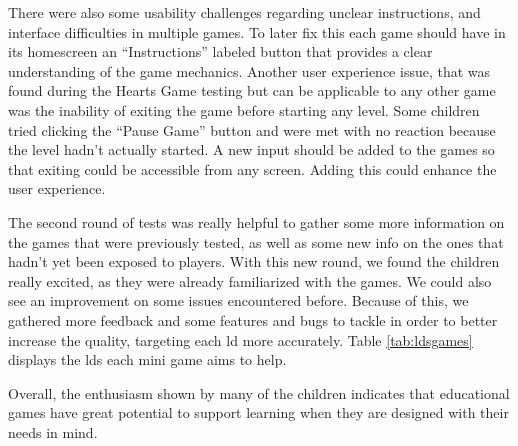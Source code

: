 
There were also some usability challenges regarding unclear instructions, and interface difficulties in multiple games. To later fix this each game should have in its homescreen an ``Instructions'' labeled button that provides a clear understanding of the game mechanics. Another user experience issue, that was found during the Hearts Game testing but can be applicable to any other game was the inability of exiting the game before starting any level. Some children tried clicking the ``Pause Game'' button and were met with no reaction because the level hadn't actually started. A new input should be added to the games so that exiting could be accessible from any screen. Adding this could enhance the user experience.

The second round of tests was really helpful to gather some more information on the games that were previously tested, as well as some new info on the ones that hadn't yet been exposed to players. With this new round, we found the children really excited, as they were already familiarized with the games. We could also see an improvement on some issues encountered before. Because of this, we gathered more feedback and some features and bugs to tackle in order to better increase the quality, targeting each \gls{ld} more accurately.
Table \ref{tab:ldsgames} displays the \glspl{ld} each mini game aims to help.

\begin{table}[H]
    \centering
    \caption{Games and Targeted Disabilities}
    \label{tab:ldsgames}
\end{table}
Overall, the enthusiasm shown by many of the children indicates that educational games have great potential to support learning when they are designed with their needs in mind.


